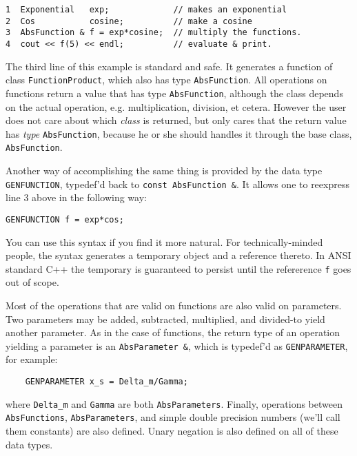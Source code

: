 \documentclass{report}
\begin{document}
\begin{verbatim}
1  Exponential   exp;             // makes an exponential
2  Cos           cosine;          // make a cosine
3  AbsFunction & f = exp*cosine;  // multiply the functions.
4  cout << f(5) << endl;          // evaluate & print. 
\end{verbatim}

\noindent The third line of this example is standard and safe.  It generates a
function of class \verb#FunctionProduct#, which also has type
\verb#AbsFunction#.  All operations on functions return
a value that has type \verb#AbsFunction#, although the class depends
on the actual operation, e.g. multiplication, division, et cetera.  However the user does not care about which
{\it class} is returned, but only cares that the return value has {\it
type} \verb#AbsFunction#, because he or she should handles it through the
base class, \verb#AbsFunction#.

\noindent Another way of accomplishing the same thing is provided by the data
type \verb#GENFUNCTION#, typedef'd back to \verb#const AbsFunction &#.  It allows
one to reexpress line 3 above in the following way:
\begin {verbatim}
GENFUNCTION f = exp*cos;
\end{verbatim}

\noindent You can use this syntax if you find it more natural. For
technically-minded people, the syntax generates a temporary object and
a reference thereto.  In ANSI standard C++ the temporary is guaranteed
to persist until the refererence \verb#f# goes out of scope.

\noindent Most of the operations that are valid on functions are also valid on
parameters.  Two parameters may be added, subtracted, multiplied, and
divided-to yield another parameter.  As in the case of functions, the
return type of an operation yielding a parameter is an \verb#AbsParameter &#,
which is typedef'd as \verb#GENPARAMETER#, for example:
\begin{verbatim}
	GENPARAMETER x_s = Delta_m/Gamma;
\end{verbatim}
where \verb#Delta_m# and \verb#Gamma# are both \verb#AbsParameters#.  Finally, operations
between \verb#AbsFunctions#, \verb#AbsParameters#, and simple double precision
numbers (we'll call them constants) are also defined.  Unary negation
is also defined on all of these data types.
\end{document}
